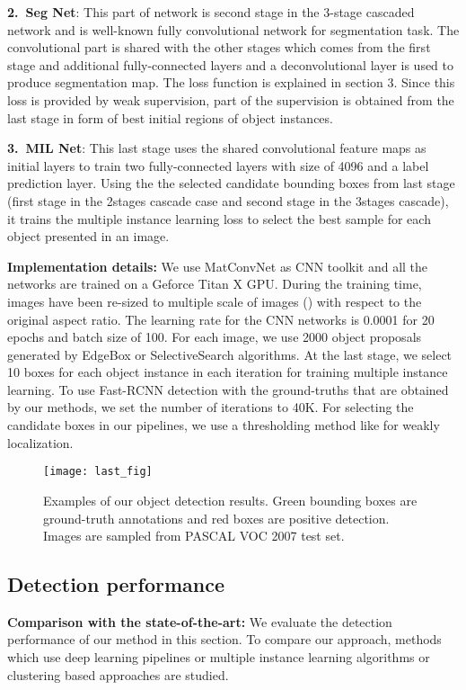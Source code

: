 \documentclass[10pt,twocolumn,letterpaper]{article}
\begin{document}
\textbf{2.~Seg Net}: This part of network is second stage in the 3-stage cascaded network and is well-known fully convolutional network for segmentation task. The convolutional part is shared with the other stages which comes from the first stage and additional fully-connected layers and a deconvolutional layer is used to produce segmentation map. The loss function is explained in section 3. Since this loss is provided by weak supervision, part of the supervision is obtained from the last stage in form of best initial regions of object instances.

\textbf{3.~MIL Net}: This last stage uses the shared convolutional feature maps as initial layers to train two fully-connected layers with size of 4096 and a label prediction layer. Using the the selected candidate bounding boxes from last stage (first stage in the 2stages cascade case and second stage in the 3stages cascade), it trains the multiple instance learning loss to select the best sample for each object presented in an image.


\textbf{Implementation details:} We use MatConvNet \cite{matconv} as CNN toolkit and all the networks are trained on a Geforce Titan X GPU. During the training time, images have been re-sized to multiple scale of images () with respect to the original aspect ratio. The learning rate for the CNN networks is 0.0001 for 20 epochs and batch size of 100. For each image, we use 2000 object proposals generated by EdgeBox or SelectiveSearch algorithms. At the last stage, we select 10 boxes for each object instance in each iteration for training multiple instance learning. To use Fast-RCNN detection with the ground-truths that are obtained by our methods, we set the number of iterations to 40K. For selecting the candidate boxes in our pipelines, we use a thresholding method like \cite{gap_paper} for weakly localization.

\begin{figure*}[htbp]
 \centering
 \texttt{[image: last\_fig]}
 \caption{Examples of our object detection results. Green bounding boxes are ground-truth annotations and red boxes are positive detection. Images are sampled from PASCAL VOC 2007 test set.}
  \label{fig:2}
 \end{figure*}

\subsection{Detection performance}
\textbf{Comparison with the state-of-the-art:} We evaluate the detection performance of our method in this section. To compare our approach, methods which use deep learning pipelines \cite{bilen16, li16} or multiple instance learning algorithms \cite{cinbis} or clustering based approaches \cite{bilen15} are studied.
\end{document}
